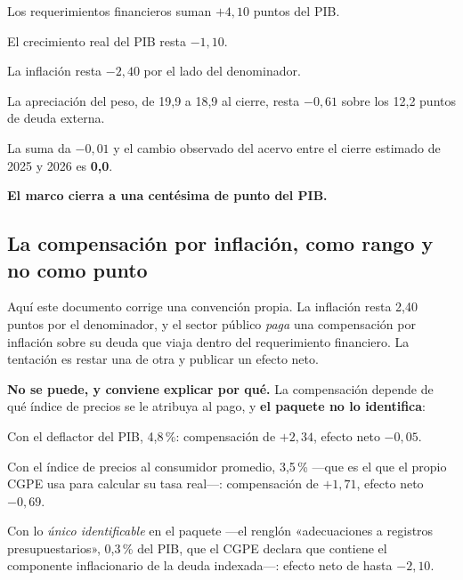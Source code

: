 \begin{list}{}{\setlength{\leftmargin}{1.4em}\setlength{\itemsep}{2pt}}
\item[$\bullet$] Los requerimientos financieros suman \textbf{$+4,10$} puntos del PIB.
\item[$\bullet$] El crecimiento real del PIB resta \textbf{$-1,10$}.
\item[$\bullet$] La inflación resta \textbf{$-2,40$} por el lado del denominador.
\item[$\bullet$] La apreciación del peso, de 19,9 a 18,9 al cierre, resta \textbf{$-0,61$}
sobre los 12,2 puntos de deuda externa.
\item[$\bullet$] La suma da \textbf{$-0,01$} y el cambio observado del acervo entre el cierre
estimado de 2025 y 2026 es \textbf{0,0}.
\end{list}

\textbf{El marco cierra a una centésima de punto del PIB.}

\subsection{La compensación por inflación, como rango y no como punto}

Aquí este documento corrige una convención propia. La inflación resta 2,40 puntos por el
denominador, y el sector público \emph{paga} una compensación por inflación sobre su deuda que
viaja dentro del requerimiento financiero. La tentación es restar una de otra y publicar un
efecto neto.

\textbf{No se puede, y conviene explicar por qué.} La compensación depende de qué índice de
precios se le atribuya al pago, y \textbf{el paquete no lo identifica}:

\begin{list}{}{\setlength{\leftmargin}{1.4em}\setlength{\itemsep}{2pt}}
\item[$\bullet$] Con el deflactor del PIB, 4,8\,\%: compensación de $+2,34$, efecto neto
\textbf{$-0,05$}.
\item[$\bullet$] Con el índice de precios al consumidor promedio, 3,5\,\% ---que es el que el
propio CGPE usa para calcular su tasa real---: compensación de $+1,71$, efecto neto
\textbf{$-0,69$}.
\item[$\bullet$] Con lo \emph{único identificable} en el paquete ---el renglón «adecuaciones a
registros presupuestarios», 0,3\,\% del PIB, que el CGPE declara que contiene el componente
inflacionario de la deuda indexada---: efecto neto de hasta \textbf{$-2,10$}.
\end{list}


